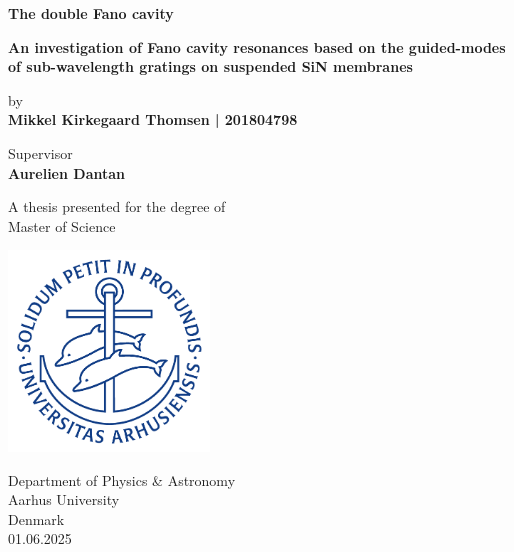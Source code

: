 \begin{titlepage}
    \begin{center}
 
        \Huge{\textbf{The double Fano cavity}}
 
        \large
        \vspace{0.5cm}
        \textbf{An investigation of Fano cavity resonances based on the guided-modes of sub-wavelength gratings on suspended SiN membranes}
 
        \vspace{0.5cm}
        \large
        by\\
        \vspace{0.5cm}
        \textbf{Mikkel Kirkegaard Thomsen | 201804798}
 
        \vspace{0.5cm}
        Supervisor\\
        \textbf{Aurelien Dantan}
 
        \vfill
 
        \large     
        A thesis presented for the degree of\\
        Master of Science
             
        \vspace{0.5cm}
      
        \includegraphics[width=0.4\textwidth]{figures/au_logo.png}
        
        \large     
        Department of Physics \& Astronomy\\
        Aarhus University\\
        Denmark\\
        01.06.2025\\
    \end{center}
 \end{titlepage}